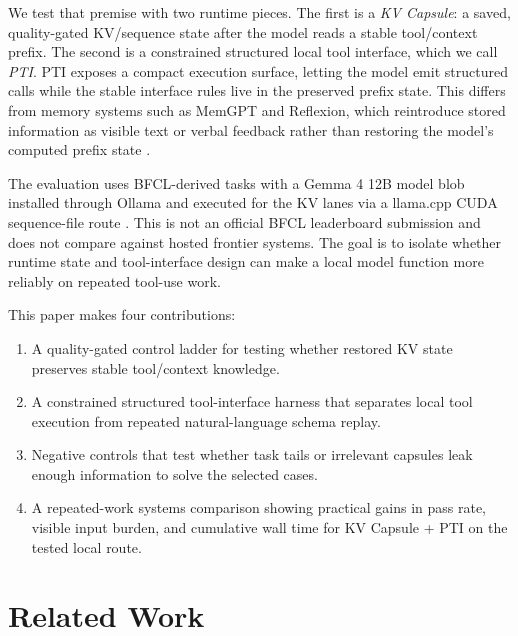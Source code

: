 \documentclass[11pt]{article}
\begin{document}
We test that premise with two runtime pieces. The first is a \emph{KV Capsule}: a saved, quality-gated KV/sequence state after the model reads a stable tool/context prefix. The second is a constrained structured local tool interface, which we call \emph{PTI}. PTI exposes a compact execution surface, letting the model emit structured calls while the stable interface rules live in the preserved prefix state. This differs from memory systems such as MemGPT and Reflexion, which reintroduce stored information as visible text or verbal feedback rather than restoring the model's computed prefix state \cite{packer2023memgpt,shinn2023reflexion}.

The evaluation uses BFCL-derived tasks \cite{bfcl2025} with a Gemma 4 12B model blob installed through Ollama and executed for the KV lanes via a llama.cpp CUDA sequence-file route \cite{llamacpp}. This is not an official BFCL leaderboard submission and does not compare against hosted frontier systems. The goal is to isolate whether runtime state and tool-interface design can make a local model function more reliably on repeated tool-use work.

This paper makes four contributions:
\begin{enumerate}[leftmargin=*]
  \item A quality-gated control ladder for testing whether restored KV state preserves stable tool/context knowledge.
  \item A constrained structured tool-interface harness that separates local tool execution from repeated natural-language schema replay.
  \item Negative controls that test whether task tails or irrelevant capsules leak enough information to solve the selected cases.
  \item A repeated-work systems comparison showing practical gains in pass rate, visible input burden, and cumulative wall time for KV Capsule + PTI on the tested local route.
\end{enumerate}

\section{Related Work}
\end{document}
